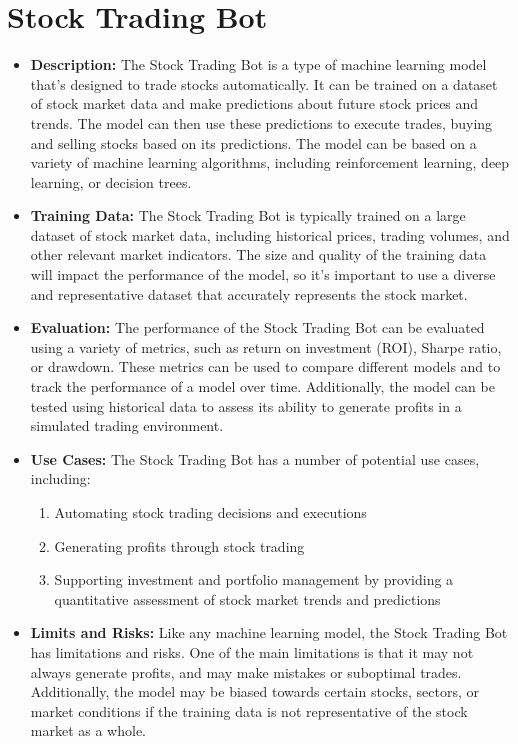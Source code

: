 \section{Stock Trading Bot}

\begin{itemize}
    \item \textbf{Description:} The Stock Trading Bot is a type of machine learning model that's designed to trade stocks automatically. It can be trained on a dataset of stock market data and make predictions about future stock prices and trends. The model can then use these predictions to execute trades, buying and selling stocks based on its predictions. The model can be based on a variety of machine learning algorithms, including reinforcement learning, deep learning, or decision trees.
    \item \textbf{Training Data:} The Stock Trading Bot is typically trained on a large dataset of stock market data, including historical prices, trading volumes, and other relevant market indicators. The size and quality of the training data will impact the performance of the model, so it's important to use a diverse and representative dataset that accurately represents the stock market.
    \item \textbf{Evaluation:} The performance of the Stock Trading Bot can be evaluated using a variety of metrics, such as return on investment (ROI), Sharpe ratio, or drawdown. These metrics can be used to compare different models and to track the performance of a model over time. Additionally, the model can be tested using historical data to assess its ability to generate profits in a simulated trading environment.
    \item \textbf{Use Cases:} The Stock Trading Bot has a number of potential use cases, including:
        \begin{enumerate}  
            \item Automating stock trading decisions and executions
            \item Generating profits through stock trading
            \item Supporting investment and portfolio management by providing a quantitative assessment of stock market trends and predictions
        \end{enumerate}
    \item \textbf{Limits and Risks:} Like any machine learning model, the Stock Trading Bot has limitations and risks. One of the main limitations is that it may not always generate profits, and may make mistakes or suboptimal trades. Additionally, the model may be biased towards certain stocks, sectors, or market conditions if the training data is not representative of the stock market as a whole.

\end{itemize}
